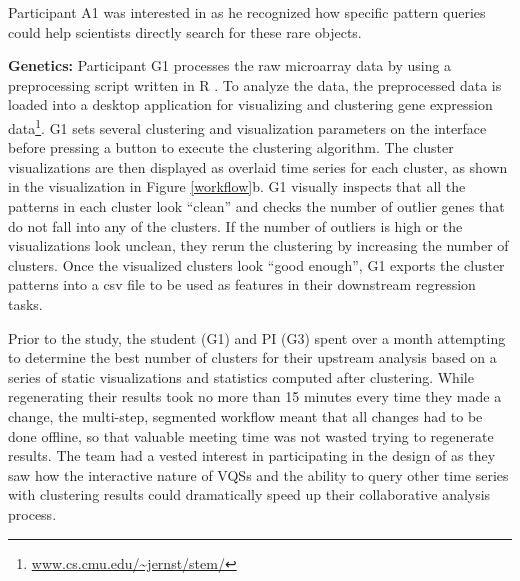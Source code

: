 Participant A1 was interested in \zv as he recognized how specific pattern queries could help scientists directly search for these rare objects. 

\par \textbf{Genetics:} Participant G1 processes the raw microarray data by using a preprocessing script written in R . To analyze the data, the preprocessed data is loaded into a desktop application for visualizing and clustering gene expression data\footnote{ \url{www.cs.cmu.edu/~jernst/stem/}}. G1 sets several clustering and visualization parameters on the interface before pressing a button to execute the clustering algorithm. The cluster visualizations are then displayed as overlaid time series for each cluster, as shown in the visualization in Figure \ref{workflow}b. G1 visually inspects that all the patterns in each cluster look ``clean'' and checks the number of outlier genes that do not fall into any of the clusters.  If the number of outliers is high or the visualizations look unclean, they rerun the clustering by increasing the number of clusters. Once the visualized clusters look ``good enough'', G1 exports the cluster patterns into a csv file to be used as features in their downstream regression tasks.
\par Prior to the study, the student (G1) and PI (G3) spent over a month attempting to determine the best number of clusters for their upstream analysis based on a series of static visualizations and statistics computed after clustering. While regenerating their results took no more than 15 minutes every time they made a change, the multi-step, segmented workflow meant that all changes had to be done offline, so that valuable meeting time was not wasted trying to regenerate results. The team had a vested interest in participating in the design of \zv as they saw how the interactive nature of VQSs and the ability to query other time series with clustering results could dramatically speed up their collaborative analysis process. 
